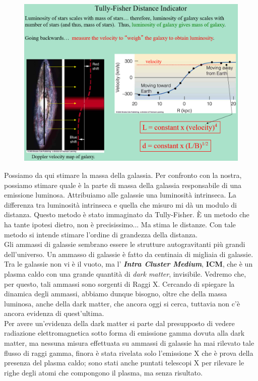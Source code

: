 \documentclass[a4paper,11pt]{article}
\begin{document}
\begin{figure} [h]
        \centering
        \includegraphics[width=\textwidth]{immagini_lezioni12-12/tully-fisher.png}
        \label{}
    \end{figure}
Possiamo da qui stimare la massa della galassia. Per confronto con la nostra, possiamo stimare quale è la parte di massa della galassia responsabile di una emissione luminosa. Attribuiamo alle galassie una luminosità intrinseca. La differenza tra luminosità intrinseca e quella che misuro mi dà un modulo di distanza. Questo metodo è stato immaginato da Tully-Fisher. È un metodo che ha tante ipotesi dietro, non è precisissimo... Ma stima le distanze. Con tale metodo si intende stimare l'ordine di grandezza della distanza.\\
Gli ammassi di galassie sembrano essere le strutture autogravitanti più grandi dell'universo. Un ammasso di galassie è fatto da centinaia di migliaia di galassie. Tra le galassie non vi è il vuoto, ma l' \textbf{\textit{Intra Cluster Medium}}, \textbf{ICM}, che è un plasma caldo con una grande quantità di \textit{dark matter}, invisibile. Vedremo che, per questo, tali ammassi sono sorgenti di Raggi X. Cercando di spiegare la dinamica degli ammassi, abbiamo dunque bisogno, oltre che della massa luminosa, anche della dark matter, che ancora oggi si cerca, tuttavia non c'è ancora evidenza di quest'ultima.\\
Per avere un'evidenza della dark matter si parte dal presupposto di vedere radiazione elettromagnetica sotto forma di emissione gamma dovuta alla dark matter, ma nessuna misura effettuata su ammassi di galassie ha mai rilevato tale flusso di raggi gamma, finora è stata rivelata solo l'emissione X che è prova della presenza del plasma caldo; sono stati anche puntati telescopi X per rilevare le righe degli atomi che compongono il plasma, ma senza risultato.\\
\end{document}
